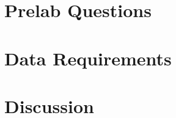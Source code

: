 \documentclass[justified]{tufte-book}
\begin{document}
\section{Prelab Questions}
\begin{enumerate}


\end{enumerate}


\section{Data Requirements}
\begin{enumerate}


\end{enumerate}


\section{Discussion}
\begin{enumerate}[resume]



\end{enumerate}




\end{document}
